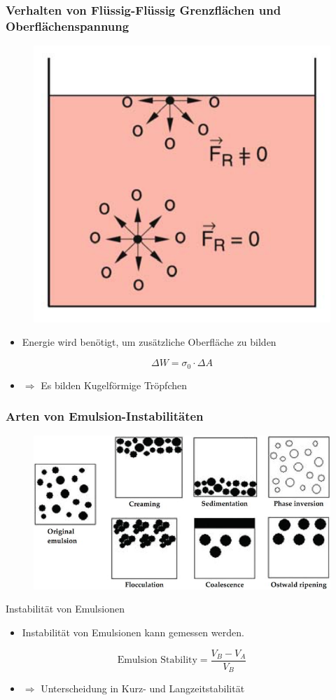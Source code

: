 \documentclass{beamer} %
\begin{document}
\begin{frame}
\frametitle{Verhalten von Flüssig-Flüssig Grenzflächen und Oberflächenspannung}
\begin{figure}
	\centering
	\includegraphics[width=0.3\linewidth]{of.png}
\end{figure}

\begin{itemize}
	\item{Energie wird benötigt, um zusätzliche Oberfläche zu bilden}
\end{itemize}

\begin{equation*}
\Delta W = \sigma_0\cdot \Delta A
\end{equation*}
\pause
\begin{itemize}
	\item $\Rightarrow$ Es bilden Kugelförmige Tröpfchen
\end{itemize}
\end{frame}
\begin{frame}
	\frametitle{Arten von Emulsion-Instabilitäten}
\begin{figure}
	\centering
	\includegraphics[width=\linewidth]{F1.png}
\end{figure}
\end{frame}

\begin{frame}{Instabilität von Emulsionen}
	\begin{itemize}
		\item Instabilität von Emulsionen kann gemessen werden.
	\end{itemize}
\begin{equation*}
\textrm{Emulsion Stability}=\frac{V_B-V_A}{V_B}
\end{equation*}
\begin{itemize}
	\item $\Rightarrow$ Unterscheidung in Kurz- und Langzeitstabilität
\end{itemize}
\end{frame}
\end{document}
